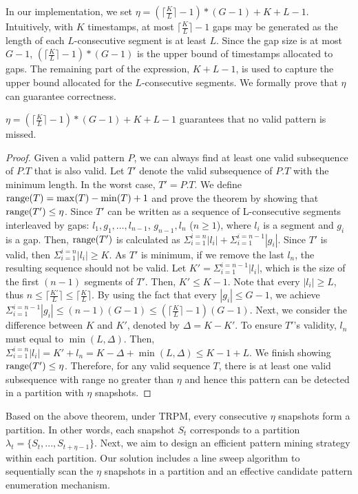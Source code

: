 In our implementation, we set $\eta = (\lceil \frac{K}{L} \rceil - 1)*(G-1)+K+L-1$. Intuitively, with $K$ timestamps, at most $\lceil \frac{K}{L} \rceil - 1$ gaps may be generated as the length of each $L$-consecutive segment is at least $L$. Since the gap size is at most $G-1$, $(\lceil \frac{K}{L} \rceil - 1)*(G-1)$ is the upper bound of timestamps allocated to gaps. The remaining part of the expression, $K+L-1$, is used to capture the upper bound allocated for the $L$-consecutive segments. We formally prove that $\eta$ can guarantee correctness.


\begin{theorem}
\label{THM:RP_ETA}
$\eta = (\lceil \frac{K}{L} \rceil - 1)*(G-1)+K+L-1$ guarantees that no valid pattern is missed.
\end{theorem}

\begin{proof}
Given a valid pattern $P$, we can always find at least one valid subsequence of $P.T$ that is also valid. Let $T'$ denote the valid subsequence of $P.T$ with the minimum length. In the worst case, $T'=P.T$. We define $\operatorname*{range}(T)=\max(T) - \min(T) +1$ and prove the theorem by showing that $\operatorname*{range}(T') \leq \eta$.
Since $T'$ can be written as a sequence of L-consecutive segments interleaved by gaps: $l_1,g_1,\ldots,l_{n-1}$, $g_{n-1},l_n$ ($n \geq 1$),
where $l_i$ is a segment and $g_i$ is a gap. Then, $\operatorname*{range}(T')$
is calculated as $\Sigma_{i=1}^{i=n}|l_i| + \Sigma_{i=1}^{i=n-1} |g_i|$. Since $T'$
is valid, then $\Sigma_{i=1}^{i=n}|l_i| \geq K$. As $T'$ is minimum, if we remove the 
last $l_n$, the resulting sequence should not be valid. Let $K' = \Sigma_{i=1}^{i=n-1}|l_i|$, which
is the size of the first $(n-1)$ segments of $T'$. Then, $K' \leq K-1$.
Note that every $|l_i| \geq L$, thus $n \leq \lceil \frac{K'}{L} \rceil \leq \lceil \frac{K}{L} \rceil $. By
using the fact that every $|g_i| \leq G-1$, we achieve $\Sigma_{i=1}^{i=n-1} |g_i| \leq (n-1)(G-1)
\leq (\lceil \frac{K}{L} \rceil -1)(G-1)$. Next, we consider the difference between $K$ and $K'$, denoted by
$\Delta = K- K'$. To ensure $T'$'s validity, $l_n$ must equal to $\min(L, \Delta)$.
Then, $\Sigma_{i=1}^{i=n}|l_i| = K' + l_n = K - \Delta + \min(L, \Delta) \leq K - 1 + L$. We finish showing $\operatorname*{range}(T') \leq \eta$.  Therefore, for any valid sequence $T$, there is at least one valid subsequence with range no greater than $\eta$ and hence this pattern can be detected in a partition with $\eta$ snapshots.
\end{proof}

Based on the above theorem, under TRPM, every consecutive $\eta$ snapshots
form a partition. In other words, each snapshot $S_t$ corresponds to a partition $\lambda_t=\{S_t,...,S_{t+\eta-1}\}$. 
Next, we aim to
design an efficient pattern mining strategy within each partition. Our solution includes a line sweep algorithm to sequentially scan the $\eta$ %
snapshots in a partition and an effective candidate pattern enumeration mechanism.  

